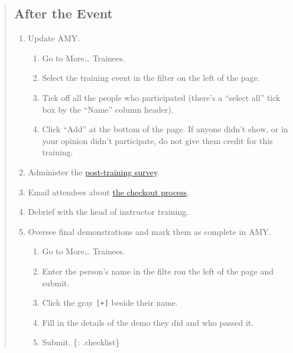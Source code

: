 \begin{quote}
\subsection{After the Event}\label{after-the-event}

\begin{enumerate}
\def\labelenumi{\arabic{enumi}.}
\itemsep1pt\parskip0pt
\item
  Update AMY.

  \begin{enumerate}
  \def\labelenumii{\arabic{enumii}.}
  \itemsep1pt\parskip0pt
  \item
    Go to More\ldots{} Trainees.
  \item
    Select the training event in the filter on the left of the page.
  \item
    Tick off all the people who participated (there's a ``select all''
    tick box by the ``Name'' column header).
  \item
    Click ``Add'' at the bottom of the page. If anyone didn't show, or
    in your opinion didn't participate, do not give them credit for this
    training.
  \end{enumerate}
\item
  Administer the \href{\{\{site.training\_post\_survey\}\}}{post-training
  survey}.
\item
  Email attendees about
  \href{\{\{\%20page.root\%20\}\}/files/messages/checkout.txt}{the
  checkout process}.
\item
  Debrief with the head of instructor training.
\item
  Oversee final demonstrations and mark them as complete in AMY.

  \begin{enumerate}
  \def\labelenumii{\arabic{enumii}.}
  \itemsep1pt\parskip0pt
  \item
    Go to More\ldots{} Trainees.
  \item
    Enter the person's name in the filte ron the left of the page and
    submit.
  \item
    Click the gray \texttt{{[}+{]}} beside their name.
  \item
    Fill in the details of the demo they did and who passed it.
  \item
    Submit. \{: .checklist\}
  \end{enumerate}
\end{enumerate}
\end{quote}

